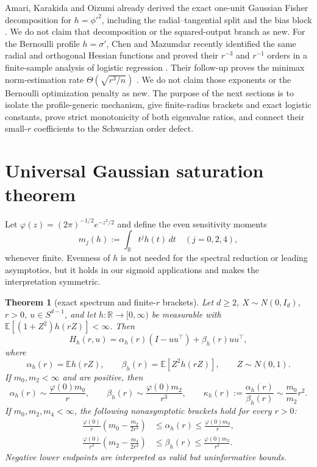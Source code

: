 \documentclass[11pt]{article}
\newtheorem{theorem}{Theorem}[section]
\newcommand{\E}{\mathbb E}
\newcommand{\R}{\mathbb R}
\begin{document}
Amari, Karakida and Oizumi already derived the exact one-unit Gaussian Fisher decomposition for
$h=\phi'^2$, including the radial--tangential split and the bias block \cite{amari2019}.  We do not claim that
decomposition or the squared-output branch as new.
For the Bernoulli profile $h=\sigma'$, Chen and Mazumdar recently identified the same radial and orthogonal
Hessian functions and proved their $r^{-3}$ and $r^{-1}$ orders in a finite-sample analysis of logistic regression
\cite{chen2026gd}.  Their follow-up proves the minimax norm-estimation rate $\Theta(\sqrt{r^3/n})$
\cite{chen2026minimax}.  We do not claim those exponents or the Bernoulli optimization penalty as new.  The
purpose of the next sections is to isolate the profile-generic mechanism, give finite-radius brackets and exact
logistic constants, prove strict monotonicity of both eigenvalue ratios, and connect their small-$r$ coefficients to
the Schwarzian order defect.

\section{Universal Gaussian saturation theorem}

Let $\varphi(z)=(2\pi)^{-1/2}e^{-z^2/2}$ and define the even sensitivity moments
\[
 m_j(h):=\int_{\R} t^j h(t)\,dt\quad(j=0,2,4),
\]
whenever finite.  Evenness of $h$ is not needed for the spectral reduction or leading asymptotics, but it holds in
our sigmoid applications and makes the interpretation symmetric.

\begin{theorem}[exact spectrum and finite-$r$ brackets]
\label{thm:universal}
Let $d\ge2$, $X\sim N(0,I_d)$, $r>0$, $u\in S^{d-1}$, and let $h:\R\to[0,\infty)$ be measurable with
$\E[(1+Z^2)h(rZ)]<\infty$.  Then
\begin{equation}
 H_h(r,u)=\alpha_h(r)(I-uu^\top)+\beta_h(r)uu^\top,
 \label{eq:decomp}
\end{equation}
where
\begin{equation}
 \alpha_h(r)=\E h(rZ),\qquad \beta_h(r)=\E[Z^2h(rZ)],\qquad Z\sim N(0,1).
 \label{eq:alphabeta}
\end{equation}
If $m_0,m_2<\infty$ and are positive, then
\begin{equation}
 \alpha_h(r)\sim\frac{\varphi(0)m_0}{r},\qquad
 \beta_h(r)\sim\frac{\varphi(0)m_2}{r^3},\qquad
 \kappa_h(r):=\frac{\alpha_h(r)}{\beta_h(r)}\sim\frac{m_0}{m_2}r^2.
 \label{eq:univasymp}
\end{equation}
If $m_0,m_2,m_4<\infty$, the following nonasymptotic brackets hold for every $r>0$:
\begin{align}
 \frac{\varphi(0)}r\left(m_0-\frac{m_2}{2r^2}\right)
 &\le \alpha_h(r)\le \frac{\varphi(0)m_0}{r},\label{eq:alphabounds}\\
 \frac{\varphi(0)}{r^3}\left(m_2-\frac{m_4}{2r^2}\right)
 &\le \beta_h(r)\le \frac{\varphi(0)m_2}{r^3}.
 \label{eq:betabounds}
\end{align}
Negative lower endpoints are interpreted as valid but uninformative bounds.
\end{theorem}
\end{document}
